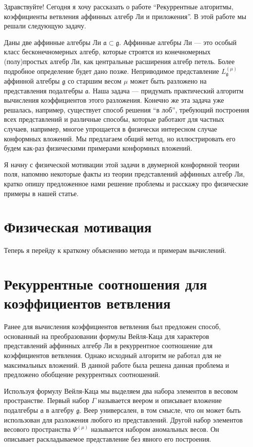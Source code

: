 Здравствуйте!
Сегодня я хочу рассказать о работе ``Рекуррентные алгоритмы, коэффициенты ветвления аффинных алгебр
Ли и приложения''. В этой работе мы решали следующую задачу.

Даны две аффинные алгебры Ли $\mathfrak{a}\subset \mathfrak{g}$. Аффинные алгебры Ли --- это особый
класс бесконечномерных алгебр, которые строятся из конечномерных (полу)простых алгебр Ли, как
центральные расширения алгебр петель. Более подробное определение будет дано позже. Неприводимое
представление $L^{(\mu)}_{\mathfrak{g}}$ аффинной алгебры $\mathfrak{g}$ со старшим весом $\mu$
может быть разложено на представления подалгебры $\mathfrak{a}$. Наша задача --- придумать
практический алгоритм вычисления коэффициентов этого разложения. Конечно же эта задача уже решалась,
например, существует способ решения ``в лоб'', требующий построения всех представлений и различные способы,
которые работают для частных случаев, например, многое упрощается в физически интересном случае
конформных вложений. Мы предлагаем общий метод, но иллюстрировать его будем как-раз физическими
примерами конформных вложений.

Я начну с физической мотивации этой задачи в двумерной конформной теории поля, напомню некоторые
факты из теории представлений аффинных алгебр Ли, кратко опишу предложенное нами решение проблемы и
расскажу про физические примеры в нашей статье.

\section{Физическая мотивация}
\label{sec:physics}


Теперь я перейду к краткому объяснению метода и примерам вычислений.

\section{Рекуррентные соотношения для коэффициентов ветвления}
\label{sec:branching}

Ранее для вычисления коэффициентов ветвления был предложен способ, основанный на преобразовании
формулы Вейля-Каца для характеров представлений аффинных алгебр Ли в рекуррентное соотношение для
коэффициентов ветвления. Однако исходный алгоритм не работал для не максимальных вложений. В данной
работе была решена данная проблема и предложено обобщение рекуррентных соотношений. 

Используя формулу Вейля-Каца мы выделяем два набора элементов в весовом пространстве. Первый набор $\Gamma$
называется веером и описывает вложение подалгебры $\mathfrak{a}$ в алгебру $\mathfrak{g}$. Веер
универсален, в том смысле, что он может быть использован для разложения любого из представлений.
Другой набор элементов весового пространства $\Psi ^{\left( \mu \right) }$ называется набором
аномальных весов. Он описывает раскладываемое представление без явного его построения. 

